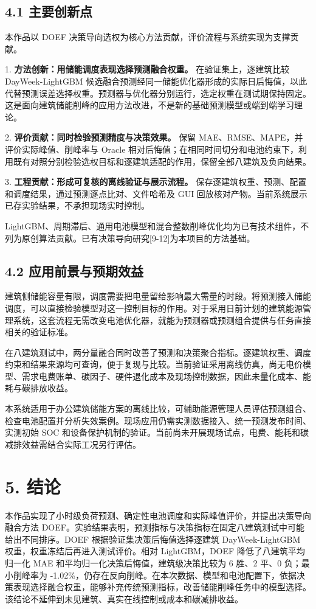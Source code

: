 \documentclass[12pt,a4paper]{article}
\begin{document}
\subsection{4.1 主要创新点}
本作品以 DOEF 决策导向选权为核心方法贡献，评价流程与系统实现为支撑贡献。\par
1. \textbf{方法创新：用储能调度表现选择预测融合权重。} 在验证集上，逐建筑比较 DayWeek-LightGBM 候选融合预测经同一储能优化器形成的实际日后悔值，以此代替预测误差选择权重。预测器与优化器分别运行，选定权重在测试期保持固定。这是面向建筑储能削峰的应用方法改进，不是新的基础预测模型或端到端学习理论。\par
2. \textbf{评价贡献：同时检验预测精度与决策效果。} 保留 MAE、RMSE、MAPE，并评价实际峰值、削峰率与 Oracle 相对后悔值；在相同时间切分和电池约束下，利用既有对照分别检验选权目标和逐建筑适配的作用，保留全部八建筑及负向结果。\par
3. \textbf{工程贡献：形成可复核的离线验证与展示流程。} 保存逐建筑权重、预测、配置和调度结果，通过预测逐点比对、文件哈希及 GUI 回放核对产物。当前系统展示已存实验结果，不承担现场实时控制。\par
LightGBM、周期滞后、通用电池模型和混合整数削峰优化均为已有技术组件，不列为原创算法贡献。已有决策导向研究[9-12]为本项目的方法基础。\par
\subsection{4.2 应用前景与预期效益}
建筑侧储能容量有限，调度需要把电量留给影响最大需量的时段。将预测接入储能调度，可以直接检验模型对这一控制目标的作用。对于采用日前计划的建筑能源管理系统，这套流程无需改变电池优化器，就能为预测器或预测组合提供与任务直接相关的验证标准。\par
在八建筑测试中，两分量融合同时改善了预测和决策聚合指标。逐建筑权重、调度约束和结果来源均可查询，便于复现与比较。当前验证采用离线仿真，尚无电价模型、需求电费账单、碳因子、硬件退化成本及现场控制数据，因此未量化成本、能耗与碳排放收益。\par
本系统适用于办公建筑储能方案的离线比较，可辅助能源管理人员评估预测组合、检查电池配置并分析失效案例。现场应用仍需实测数据接入、统一预测发布时间、实测初始 SOC 和设备保护机制的验证。当前尚未开展现场试点，电费、能耗和碳减排效益需结合实际工况另行评估。\par
\clearpage
\section{5. 结论}
本作品实现了小时级负荷预测、确定性电池调度和实际峰值评价，并提出决策导向融合方法 DOEF。实验结果表明，预测指标与决策指标在固定八建筑测试中可能给出不同排序。DOEF 根据验证集决策后悔值选择逐建筑 DayWeek-LightGBM 权重，权重冻结后再进入测试评价。相对 LightGBM，DOEF 降低了八建筑平均归一化 MAE 和平均归一化决策后悔值，建筑级决策比较为 6 胜、2 平、0 负；最小削峰率为 -1.02\%，仍存在反向削峰。在本次数据、模型和电池配置下，依据决策表现选择融合权重，能够补充传统预测指标，改善储能削峰任务中的模型选择。该结论不延伸到未见建筑、真实在线控制或成本和碳减排收益。\par
\end{document}
